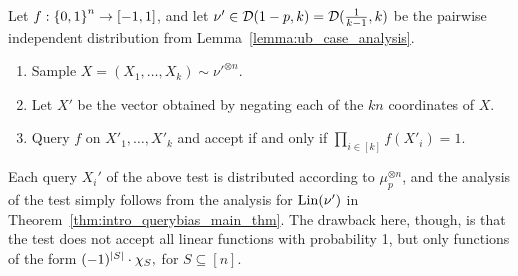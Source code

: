 Let $f:\left\{ 0,1 \right\}^n\to [-1,1]$, and let $\nu' \in \mathcal D(1-p,k)=\mathcal D(\frac{1}{k-1},k)$ be the pairwise independent distribution from Lemma~\ref{lemma:ub_case_analysis}.
\begin{enumerate}
	\item Sample $X=(X_1,\dots,X_k)\sim \nu'^{\otimes n}$.
	\item Let $X'$ be the vector obtained by negating each of the $kn$ coordinates of $X$.
	\item Query $f$ on $X'_1,\dots,X'_k$ and accept if and only if $\prod_{i\in [k]} f(X'_i) = 1$.  
\end{enumerate}
Each query $X_i'$ of the above test is distributed according to $\mu_p^{\otimes n}$, and the analysis of the test simply follows from the analysis for $\textnormal{Lin}(\nu')$ in Theorem~\ref{thm:intro_querybias_main_thm}.
The drawback here, though, is that the test does not accept all linear functions with probability 1, but only functions of the form $(-1)^{\left|S\right|}\cdot \chi_S,$ for $S\subseteq[n]$.

